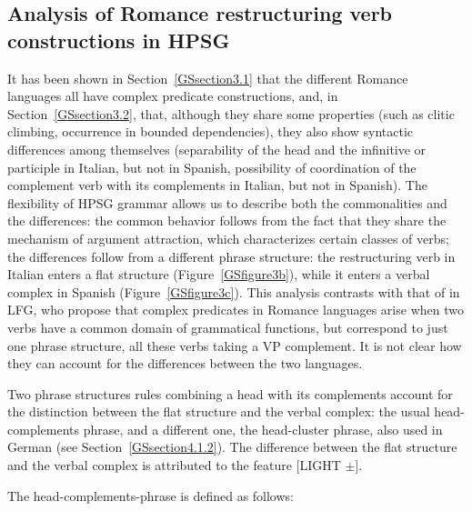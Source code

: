 \documentclass[output=paper
                ,modfonts
                ,nonflat
	        ,collection
	        ,collectionchapter
	        ,collectiontoclongg
 	        ,biblatex
                ,babelshorthands
                ,newtxmath
                ,draftmode
                ,colorlinks, citecolor=brown
]{./langsci/langscibook}
\begin{document}
{\subsection{Analysis of Romance restructuring verb constructions in HPSG} \label{GSsection3.3}

It has been shown in Section~\ref{GSsection3.1} that the different Romance languages all have complex predicate constructions, and, in Section~\ref{GSsection3.2}, that, although they share some properties (such as clitic climbing, occurrence in bounded dependencies), they also show syntactic differences among themselves (separability of the head and the infinitive or participle in Italian, but not in Spanish, possibility of coordination of the complement verb with its complements in Italian, but not in Spanish). The flexibility of HPSG grammar allows us to describe both the commonalities and the differences: the common behavior follows from the fact that they share the mechanism of argument attraction, which characterizes certain classes of verbs; the differences follow from a different phrase structure: the restructuring verb in Italian enters a flat structure (Figure~\ref{GSfigure3b}), while it enters a verbal complex in Spanish (Figure~\ref{GSfigure3c}). This analysis contrasts with that of \cite{andrews1999complex} in LFG, who propose that complex predicates in Romance languages arise when two verbs have a common domain of grammatical functions, but correspond to just one phrase structure, all these verbs taking a VP complement. It is not clear how they can account for the differences between the two languages.

Two phrase structures rules combining a head with its complements account for the distinction between the flat structure and the verbal complex: the usual head-complements phrase, and a different one, the head-cluster phrase, also used in German (see Section~\ref{GSsection4.1.2}). The difference between the flat structure and the verbal complex is attributed to the feature [LIGHT $\pm$]. 

The head-complements-phrase is defined as follows:

\begin{exe}
\end{exe}


}
\end{document}
